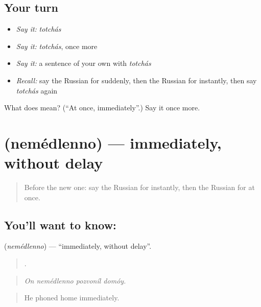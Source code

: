 \subsection*{Your turn}
\begin{itemize}
\raggedright
  \item \emph{Say it:} \emph{totchás}
  \item \emph{Say it:} \emph{totchás}, once more
  \item \emph{Say it:} a sentence of your own with \emph{totchás}
  \item \emph{Recall:} say the Russian for suddenly, then the Russian for instantly, then say \emph{totchás} again
\end{itemize}

\begin{tcolorbox}[breakable,colback=teal!4,colframe=teal!35!black,title={Before you move on}]
What does  mean? (\textquotedblleft{}At once, immediately\textquotedblright{}.) Say it once more.
\end{tcolorbox}
\section[\texorpdfstring{\ru{немедленно} (nemédlenno)}{немедленно (nemédlenno)}]{ (nemédlenno) — immediately, without delay}

\label{lesson:RU-C271-nemedlenno}



\begin{quote}
Before the new one: say the Russian for instantly, then the Russian for at once.
\end{quote}

\subsection*{You'll want to know: }
\textbf{} (\emph{nemédlenno}) — \textquotedblleft{}immediately, without delay\textquotedblright{}.

\begin{quote}
   .
\end{quote}

\begin{quote}
\emph{On nemédlenno pozvoníl domóy.}
\end{quote}

\begin{quote}
He phoned home immediately.
\end{quote}

